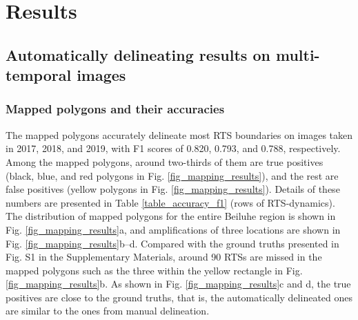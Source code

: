 \documentclass[authoryear,preprint,review,12pt]{elsarticle}
\begin{document}
\section{Results}
\label{sec_result}


\subsection{Automatically delineating results on multi-temporal images}
\label{sec_result_auto_deliea}


\subsubsection{Mapped polygons and their accuracies} %
\label{sec_mapped_polygons}

The mapped polygons accurately delineate most RTS boundaries on images taken in 2017, 2018, and 2019, with F1 scores of 0.820, 0.793, and 0.788, respectively.
Among the mapped polygons, around two-thirds of them are true positives (black, blue, and red polygons in Fig. \ref{fig_mapping_results}), and the rest are false positives (yellow polygons in Fig. \ref{fig_mapping_results}). 
Details of these numbers are presented in Table \ref{table_accuracy_f1} (rows of RTS-dynamics).
The distribution of mapped polygons for the entire Beiluhe region is shown in Fig. \ref{fig_mapping_results}a, and amplifications of three locations are shown in Fig. \ref{fig_mapping_results}b--d. 
Compared with the ground truths presented in Fig. S1 in the Supplementary Materials,  around 90 RTSs are missed in the mapped polygons such as the three within the yellow rectangle in Fig. \ref{fig_mapping_results}b.
As shown in Fig. \ref{fig_mapping_results}c and d, the true positives are close to the ground truths, that is, the automatically delineated ones are similar to the ones from manual delineation. 

\end{document}
